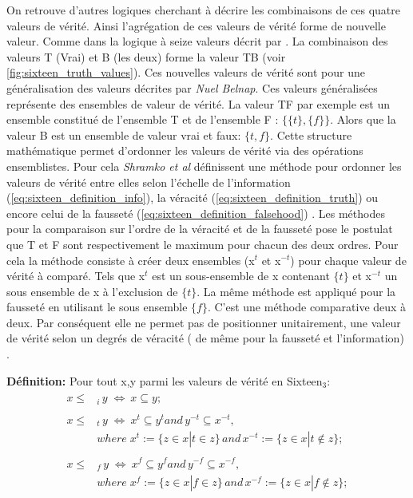 \begin{refsegment}
    On retrouve d'autres logiques cherchant à décrire les combinaisons de ces quatre valeurs de vérité. Ainsi l'agrégation de ces valeurs de vérité forme de nouvelle valeur. Comme dans la logique à seize valeurs décrit par \citeauthor{shramko2005some} \cite{shramko2005some,shramko2011truth,shramko2006hyper}. La combinaison des valeurs T (Vrai) et B (les deux) forme la valeur TB (voir \cref{fig:sixteen_truth_values}). Ces nouvelles valeurs de vérité sont pour \citeauthor{shramko2005some} une généralisation des valeurs décrites par \textit{Nuel Belnap}. Ces valeurs généralisées représente des ensembles de valeur de vérité. La valeur TF par exemple est un ensemble constitué de l'ensemble T et de l'ensemble F : $\{\{t\},\{f\}\}$. Alors que la valeur B est un ensemble de valeur vrai et faux: $\{t,f\}$. Cette structure mathématique permet d'ordonner les valeurs de vérité via des opérations ensemblistes. Pour cela \textit{Shramko et al} définissent une méthode pour ordonner les valeurs de vérité entre elles selon l'échelle de l'information (\ref{eq:sixteen_definition_info}), la véracité (\ref{eq:sixteen_definition_truth}) ou encore celui de la fausseté (\ref{eq:sixteen_definition_falsehood}) . Les méthodes pour la comparaison sur l'ordre de la véracité et de la fausseté pose le postulat que T et F sont respectivement le maximum pour chacun des deux ordres. Pour cela la méthode consiste à créer deux ensembles (x$^{t}$ et x$^{-t}$) pour chaque valeur de vérité à comparé. Tels que x$^{t}$ est un sous-ensemble de x contenant $\{t\}$ et x$^{-t}$ un sous ensemble de x à l'exclusion de $\{t\}$. La même méthode est appliqué pour la fausseté en utilisant le sous ensemble $\{f\}$.  C'est une méthode comparative deux à deux. Par conséquent elle ne permet pas de positionner unitairement, une valeur de vérité selon un degrés de véracité ( de même pour la fausseté et l'information) .
    
    \textbf{Définition:} Pour tout x,y parmi les valeurs de vérité en Sixteen$_{3}$:\nolisttopbreak \vspace{-0.5cm}
    \begin{align}
        \begin{split}
        x \leq& _{i} \, y \; \iff \: x \subseteq y\label{eq:sixteen_definition_info};
        \end{split}\\ \begin{split}\label{eq:sixteen_definition_truth}
        x \leq& _{t} \, y \; \iff \: x^{t} \subseteq y^{t} and \, y^{-t} \subseteq x^{-t},\\
              &where \; x^{t} := \{z \in x | t \in z \} \, and \, x^{-t} := \{z \in x | t \notin z \};
        \end{split}\\ \begin{split}\label{eq:sixteen_definition_falsehood}
        x \leq& _{f} \, y \; \iff \: x^{f} \subseteq y^{f} and \, y^{-f} \subseteq x^{-f},\\
              &where \; x^{f} := \{z \in x | f \in z \} \, and \, x^{-f} := \{z \in x | f \notin z \};
        \end{split}
    \end{align}
    

\end{refsegment}
